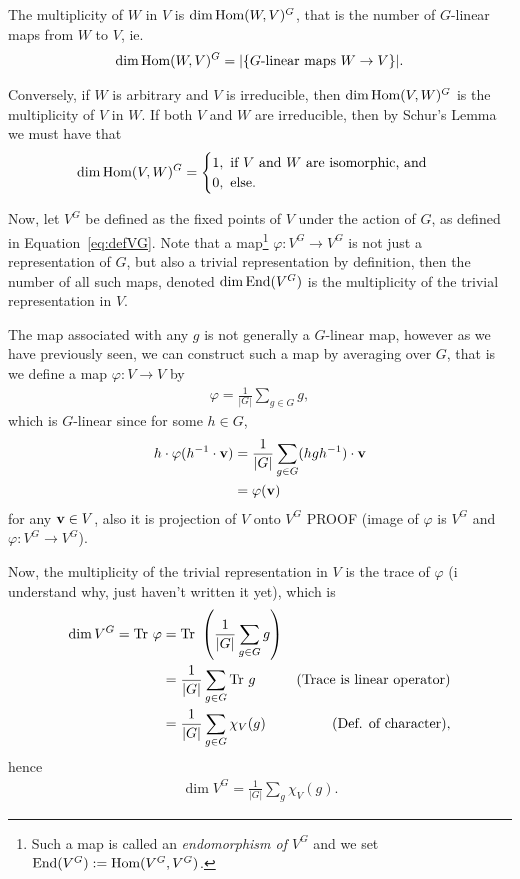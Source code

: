 \begin{conjecture}
	The multiplicity of $W$ in $V$ is $\dim \text{Hom}(W,V)^G$, that is the number of $G$-linear maps from $W$ to $V$, ie. \begin{align*}
		\dim \text{Hom}(W,V)^G = |\{\text{$G$-linear maps $W \rightarrow V$}\}|.
	\end{align*}
\end{conjecture}

Conversely, if $W$ is arbitrary and $V$ is irreducible, then $\dim \text{Hom} (V,W)^G$ is the multiplicity of $V$ in $W$. If both $V$ and $W$ are irreducible, then by Schur's Lemma we must have that
\begin{align}\label{eq:dimhomVWG}
	\dim \text{Hom} (V,W)^G = \begin{cases}
		1, \text{ if $V$ and $W$ are isomorphic, and} \\
		0, \text{ else.}
	\end{cases}
\end{align}

Now, let $V^G$ be defined as the fixed points of $V$ under the action of $G$, as defined in Equation~\ref{eq:defVG}. Note that a map\footnote{Such a map is called an \textit{endomorphism of $V^G$} and we set $\text{End}(V^G) := \text{Hom}(V^G, V^G)$.} $\varphi: V^G \rightarrow V^G$ is not just a representation of $G$, but also a trivial representation by definition, then the number of all such maps, denoted $\dim \text{End}(V^G)$ is the multiplicity of the trivial representation in $V$. 

The map associated with any $g$ is not generally a $G$-linear map, however as we have previously seen, we can construct such a map by averaging over $G$, that is we define a map $\varphi: V \rightarrow V$ by
\begin{align*}
	\varphi = \frac{1}{|G|} \sum_{g \in G} g,
\end{align*}
which is $G$-linear since for some $h \in G$, \begin{align*}
	h \cdot \varphi(h^{-1} \cdot \mathbf{v}) &= \frac{1}{|G|} \sum_{g \in G} (hgh^{-1}) \cdot \mathbf{v} \\
	&= \varphi(\mathbf{v})
\end{align*} for any $\mathbf{v} \in V$, also it is projection of $V$ onto $V^G$ PROOF (image of $\varphi$ is $V^G$ and $\varphi:V^G \rightarrow V^G$). 

Now, the multiplicity of the trivial representation in $V$ is the trace of $\varphi$ (i understand why, just haven't written it yet),  which is
\begin{align*}
	\dim V^G = \text{Tr } \varphi &= \text{Tr } \left( \frac{1}{|G|} \sum_{g \in G} g \right) \\
	&= \frac{1}{|G|} \sum_{g \in G} \text{Tr } g & \text{(Trace is linear operator)} \\
	&= \frac{1}{|G|} \sum_{g \in G} \chi_{V}(g) & \text{(Def. of character)},
\end{align*}
hence \begin{align}\label{eq:multVG}
	\dim V^G = \frac{1}{|G|} \sum_g \chi_V(g).
\end{align}

